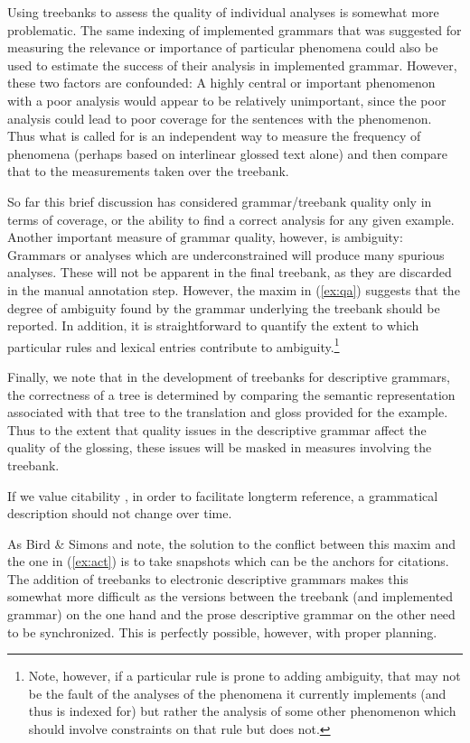 \documentclass[12pt]{article}
\begin{document}
Using treebanks to assess the quality of individual analyses
is somewhat more problematic.  The same indexing of implemented grammars
that was suggested for measuring the relevance or importance of
particular phenomena could also be used to estimate the success
of their analysis in implemented grammar.  However, these two
factors are confounded:  A highly central or important phenomenon with
a poor analysis would appear to be relatively unimportant, since the
poor analysis could lead to poor coverage for the sentences with
the phenomenon.  Thus what is called for is an independent way to
measure the frequency of phenomena (perhaps based on interlinear
glossed text alone) and then compare that to the measurements taken
over the treebank.

So far this brief discussion has considered grammar/treebank
quality only in terms of coverage, or the ability to find a correct
analysis for any given example.  Another important measure of grammar
quality, however, is ambiguity: Grammars or analyses which are
underconstrained will produce many spurious analyses.  These will not
be apparent in the final treebank, as they are discarded in the manual
annotation step.  However, the maxim in (\ref{ex:qa}) suggests that the
degree of ambiguity found by the grammar underlying the treebank
should be reported.  In addition, it is straightforward to quantify the
extent to which particular rules and lexical entries contribute to
ambiguity.\footnote{Note, however, if a particular rule is prone
to adding ambiguity, that may not be the fault of the analyses of
the phenomena it currently implements (and thus is indexed for) but
rather the analysis of some other phenomenon which should involve
constraints on that rule but does not.}

Finally, we note that in the development of treebanks for descriptive
grammars, the correctness of a tree is determined by comparing the
semantic representation associated with that tree to the translation
and gloss provided for the example.  Thus to the extent that quality
issues in the descriptive grammar affect the quality of the glossing,
these issues will be masked in measures involving the treebank.

\begin{exe}
 If we value citability \cite[14]{Bir:Sim:03},
in order to facilitate longterm reference, a grammatical description
should not change over time.
\end{exe}

As \nocite{Bir:Sim:03} Bird \& Simons and \citeauthor{Nordhoff:08} note,
the solution to the conflict between this maxim and the one
in (\ref{ex:act}) is to take snapshots which can be the anchors
for citations.  The addition of treebanks to electronic descriptive
grammars makes this somewhat more difficult as the versions between
the treebank (and implemented grammar) on the one hand and the
prose descriptive grammar on the other need to be synchronized.
This is perfectly possible, however, with proper planning.
\end{document}

